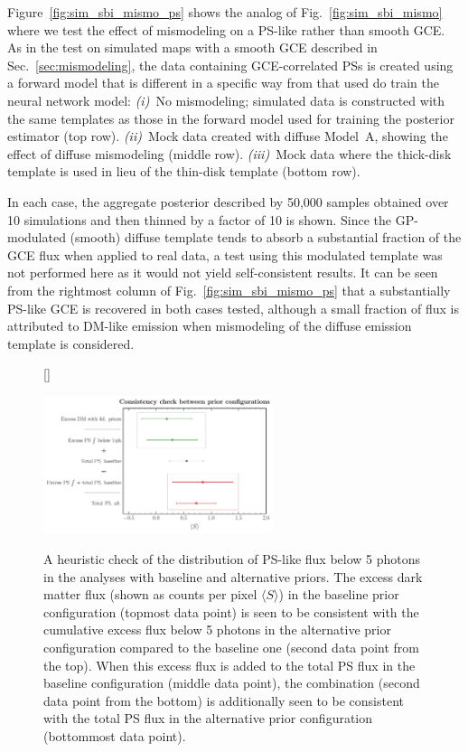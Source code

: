 \documentclass[prd,aps,10pt,nofootinbib,twocolumn,superscriptaddress,preprintnumbers,balancelastpage,longbibliography,floatfix]{revtex4-2}
\begin{document}
Figure~\ref{fig:sim_sbi_mismo_ps} shows the analog of Fig.~\ref{fig:sim_sbi_mismo} where we test the effect of mismodeling on a PS-like rather than smooth GCE. As in the test on simulated maps with a smooth GCE described in Sec.~\ref{sec:mismodeling}, the data containing GCE-correlated PSs is created using a forward model that is different in a specific way from that used do train the neural network model: \emph{(i)}~No mismodeling; simulated data is constructed with the same templates as those in the forward model used for training the posterior estimator (top row). \emph{(ii)}~Mock data created with diffuse {Model~A}, showing the effect of diffuse mismodeling (middle row). \emph{(iii)}~Mock data where the thick-disk template is used in lieu of the thin-disk template (bottom row). 

In each case, the aggregate posterior described by 50,000 samples obtained over 10 simulations and then thinned by a factor of 10 is shown. Since the GP-modulated (smooth) diffuse template tends to absorb a substantial fraction of the GCE flux when applied to real \Fermi data, a test using this modulated template was not performed here as it would not yield self-consistent results.
It can be seen from the rightmost column of Fig.~\ref{fig:sim_sbi_mismo_ps} that a substantially PS-like GCE is recovered in both cases tested, although a small fraction of flux is attributed to DM-like emission when mismodeling of the diffuse emission template is considered.

%
\begin{figure}[!htbp]
[\FBwidth]
{\caption{A heuristic check of the distribution of PS-like flux below 5 photons in the analyses with baseline and alternative priors. The excess dark matter flux (shown as counts per pixel $\langle S \rangle$) in the baseline prior configuration (topmost data point) is seen to be consistent with the cumulative excess flux below 5 photons in the alternative prior configuration compared to the baseline one (second data point from the top). When this excess flux is added to the total PS flux in the baseline configuration (middle data point), the combination (second data point from the bottom) is additionally seen to be consistent with the total PS flux in the alternative prior configuration (bottommost data point).}
\label{fig:consistency}}
{\includegraphics[width=0.6\textwidth]{plots/consistency_check.pdf}}
\end{figure}
%
\end{document}
